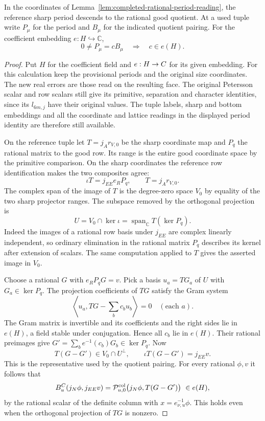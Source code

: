 \begin{proposition}\label{prop:rational-period-factor}
In the coordinates of Lemma~\ref{lem:completed-rational-period-reading}, the reference sharp
period descends to the rational good quotient. At a used tuple write \(P_\mu\) for the period and \(B_\mu\) for the indicated quotient pairing. For the coefficient embedding \(e:H\hookrightarrow\mathbb C\),
\[
 0\ne P_\mu=c B_\mu\quad\Longrightarrow\quad c\in e(H).
\]
\end{proposition}

\begin{proof}
Put \(H\) for the coefficient field and \(e:H\to C\) for its
given embedding. For this calculation keep the provisional
periods and the original size coordinates. The new real errors
are those read on the resulting face. The original Petersson
scalar and row scalars still give its primitive, separation
and character identities, since its \(l_{6m,j}\) have their
original values. The tuple labels, sharp and bottom embeddings
and all the coordinate and lattice readings in the displayed
period identity are therefore still available.

On the reference tuple let \(T=j_A r_{V,0}\) be the sharp
coordinate map and \(P_q\) the rational matrix to the good row.
Its range is the entire good coordinate space by the primitive
comparison. On the sharp coordinates the reference row identification makes the two composites agree:
\[
 \iota T=j_{EE}e_RP_q,\qquad T=j_A r_{V,0}.
\]
The complex span of the image of \(T\) is the degree-zero
space \(V_0\) by equality of the two sharp projector ranges.
The subspace removed by the orthogonal projection is
\[
 U=V_0\cap\ker\iota=\operatorname{span}_{\mathbb C}T(\ker P_q).
\] Indeed the images of a rational row basis
under \(j_{EE}\) are complex linearly independent, so ordinary
elimination in the rational matrix \(P_q\) describes its
kernel after extension of scalars. The same computation
applied to \(T\) gives the asserted image in \(V_0\).

Choose a rational \(G\) with \(e_RP_qG=v\). Pick a basis
\(u_a=TG_a\) of \(U\) with \(G_a\in\ker P_q\). The projection
coefficients of \(TG\) satisfy the Gram system
\[
 \left\langle u_a,TG-\sum_b c_b u_b\right\rangle=0
 \quad(\text{each }a).
\]
The Gram matrix is invertible and its coefficients and the
right sides lie in \(e(H)\), a field stable under conjugation.
Hence all \(c_b\) lie in \(e(H)\). Their rational preimages
give \(G'=\sum_b e^{-1}(c_b)G_b\in\ker P_q\). Now
\[
 T(G-G')\in V_0\cap U^\perp,\qquad \iota T(G-G')=j_{EE}v .
\]
This is the representative used by the quotient pairing.
For every rational \(\phi,v\) it follows that
\[
   B_u^{C}(j_N\phi,j_{EE}v)
    = \mathcal P^{\rm col}_{u,0}
       \big(j_N\phi,T(G-G')\big)\ \in e(H),
\]
by the rational scalar of the definite column with
\(x=e_{\nu,u}^{-1}\phi\). This holds even when the orthogonal
projection of \(TG\) is nonzero.


\end{proof}
